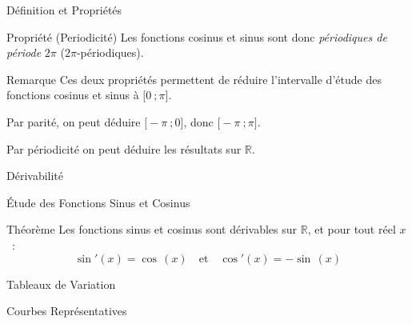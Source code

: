 \documentclass{coursbook}
\begin{document}
\begin{Gpartie}{Définition et Propriétés}
\begin{Spartie}{Propriété (Periodicité)}
            Les fonctions cosinus et sinus sont donc \emph{périodiques de période} $2\pi$ ($2\pi$-périodiques).
        \end{Spartie}
        \begin{Spartie}{Remarque} 
            Ces deux propriétés permettent de réduire l'intervalle d'étude des fonctions cosinus et sinus à $\big[0~;\pi\big]$.

            Par parité, on peut déduire $\big[-\pi~;0\big]$, donc $\big[-\pi~;\pi\big]$.
            
            Par périodicité on peut déduire les résultats sur $\mathbb{R}$.
        \end{Spartie}
    \end{Gpartie}
    \begin{Gpartie}{Dérivabilité} 
        \begin{Spartie}{Étude des Fonctions Sinus et Cosinus} 
            \begin{SSpartie}{Théorème} 
                Les fonctions sinus et cosinus sont dérivables sur $\mathbb{R}$, et pour tout réel $x$~: \[\boxed{\sin'(x)=\cos\,(x)}\quad\text{et}\quad\boxed{\cos'(x)=-\sin\,(x)}\]
            \end{SSpartie}
            \begin{SSpartie}{Tableaux de Variation} 
                \begin{center}
                    \parbox{\linewidth}{}
                \end{center}
            \end{SSpartie} \pagebreak
            \begin{SSpartie}{Courbes Représentatives} 

\end{SSpartie}
\end{Spartie}
\end{Gpartie}
\end{document}

